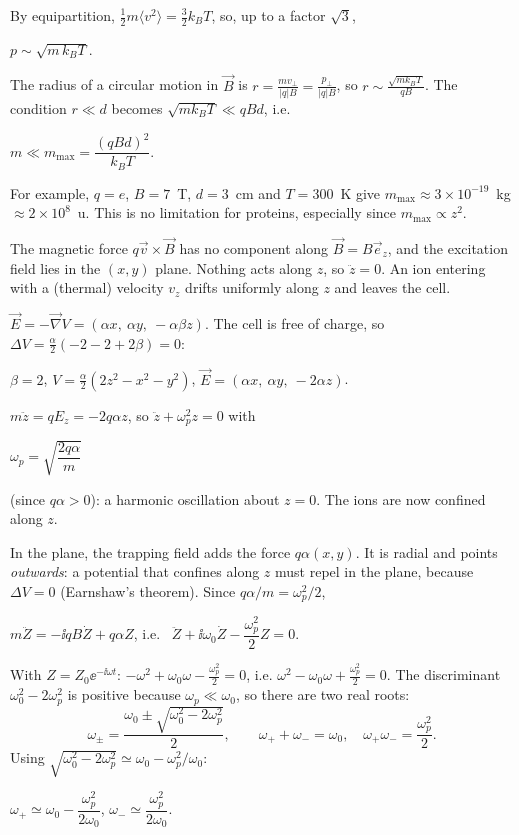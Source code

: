 \documentclass[11pt,a4paper]{article}
\newcommand{\vv}[1]{\vec{#1}}
\begin{document}
By equipartition, $\frac12m\langle v^2\rangle = \frac32k_BT$, so, up to a factor $\sqrt3$,
\begin{result}
$p\sim\sqrt{m\,k_BT}$.
\end{result}

The radius of a circular motion in $\vv B$ is $r = \frac{mv_\perp}{|q|B} = \frac{p_\perp}{|q|B}$,
so $r\sim\frac{\sqrt{mk_BT}}{qB}$. The condition $r\ll d$ becomes $\sqrt{mk_BT}\ll qBd$, i.e.
\begin{result}
$m\ll m_{\max} = \dfrac{(qBd)^2}{k_BT}$.
\end{result}
For example, $q = e$, $B = 7$~T, $d = 3$~cm and $T = 300$~K give
$m_{\max}\approx3\times10^{-19}$~kg $\approx2\times10^8$~u. This is no limitation for
proteins, especially since $m_{\max}\propto z^2$.


The magnetic force $q\vv v\times\vv B$ has no component along $\vv B = B\vv e_z$, and the
excitation field lies in the $(x,y)$ plane. Nothing acts along $z$, so $\ddot z = 0$. An ion
entering with a (thermal) velocity $v_z$ drifts uniformly along $z$ and leaves the cell.

$\vv E = -\vv\nabla V = (\alpha x,\ \alpha y,\ -\alpha\beta z)$. The cell is free of charge, so
$\Delta V = \frac\alpha2(-2-2+2\beta) = 0$:
\begin{result}
$\beta = 2$, \quad $V = \frac\alpha2(2z^2 - x^2 - y^2)$, \quad
$\vv E = (\alpha x,\ \alpha y,\ -2\alpha z)$.
\end{result}

$m\ddot z = qE_z = -2q\alpha z$, so $\ddot z + \omega_p^2z = 0$ with
\begin{result}
$\omega_p = \sqrt{\dfrac{2q\alpha}{m}}$
\end{result}
(since $q\alpha > 0$): a harmonic oscillation about $z = 0$. The ions are now confined along
$z$.

In the plane, the trapping field adds the force $q\alpha(x,y)$. It is radial and points
\emph{outwards}: a potential that confines along $z$ must repel in the plane, because
$\Delta V = 0$ (Earnshaw's theorem). Since $q\alpha/m = \omega_p^2/2$,
\begin{result}
$m\ddot Z = -\ii qB\dot Z + q\alpha Z$, \quad i.e.\ \quad
$\ddot Z + \ii\omega_0\dot Z - \dfrac{\omega_p^2}{2}Z = 0$.
\end{result}

With $Z = Z_0\ee^{-\ii\omega t}$: $-\omega^2 + \omega_0\omega - \frac{\omega_p^2}2 = 0$, i.e.
$\omega^2 - \omega_0\omega + \frac{\omega_p^2}2 = 0$. The discriminant
$\omega_0^2 - 2\omega_p^2$ is positive because $\omega_p\ll\omega_0$, so there are two real
roots:
\[
  \omega_\pm = \frac{\omega_0\pm\sqrt{\omega_0^2 - 2\omega_p^2}}{2},
  \qquad \omega_+ + \omega_- = \omega_0,\quad \omega_+\omega_- = \frac{\omega_p^2}2 .
\]
Using $\sqrt{\omega_0^2-2\omega_p^2}\simeq\omega_0 - \omega_p^2/\omega_0$:
\begin{result}
$\omega_+\simeq\omega_0 - \dfrac{\omega_p^2}{2\omega_0}$, \qquad
$\omega_-\simeq\dfrac{\omega_p^2}{2\omega_0}$.
\end{result}
\end{document}
